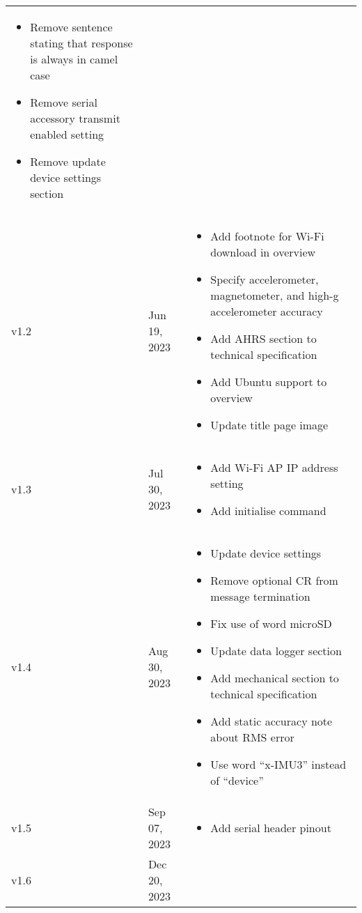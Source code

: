 \begin{longtable}{| >{\centering}p{} | p{} | >{\raggedright\arraybackslash}p{} |}
\begin{itemize}
        \item Remove sentence stating that response is always in camel case
        \item Remove serial accessory transmit enabled setting
        \item Remove update device settings section
    \end{itemize}\\
    v1.2 & Jun 19, 2023 &
    \begin{itemize}
        \item Add footnote for Wi-Fi download in overview
        \item Specify accelerometer, magnetometer, and high-g accelerometer accuracy
        \item Add AHRS section to technical specification
        \item Add Ubuntu support to overview
        \item Update title page image
    \end{itemize}\\
    v1.3 & Jul 30, 2023 &
    \begin{itemize}
        \item Add Wi-Fi \ac{AP} \ac{IP} address setting
        \item Add initialise command
    \end{itemize}\\
    v1.4 & Aug 30, 2023 &
    \begin{itemize}
        \item Update device settings
        \item Remove optional CR from message termination
        \item Fix use of word \ac{microSD}
        \item Update data logger section
        \item Add mechanical section to technical specification
        \item Add static accuracy note about \ac{RMS} error
        \item Use word \enquote{x-IMU3} instead of \enquote{device}
    \end{itemize}\\
    v1.5 & Sep 07, 2023 &
    \begin{itemize}
        \item Add serial header pinout
    \end{itemize}\\
    v1.6 & Dec 20, 2023 &
    \begin{itemize}

\end{itemize}
\end{longtable}
